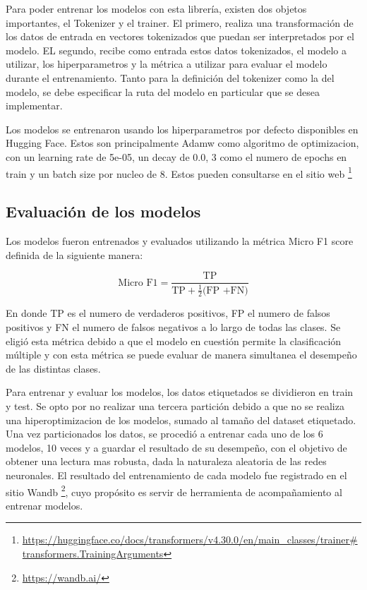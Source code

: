 Para poder entrenar los modelos con esta librería, existen dos objetos importantes, el Tokenizer y el trainer. El primero, realiza una transformación de los datos de entrada en vectores tokenizados que puedan ser interpretados por el modelo. EL segundo, recibe como entrada estos datos tokenizados, el modelo a utilizar, los hiperparametros y la métrica a utilizar para evaluar el modelo durante el entrenamiento. Tanto para la definición del tokenizer como la del modelo, se debe especificar la ruta del modelo en particular que se desea implementar.

Los modelos se entrenaron usando los hiperparametros por defecto disponibles en Hugging Face. Estos son principalmente Adamw como algoritmo de optimizacion, con un learning rate de 5e-05, un
decay de 0.0, 3 como el numero de epochs en train y un batch size por nucleo de 8. Estos pueden consultarse en el sitio web \footnote{\url{https://huggingface.co/docs/transformers/v4.30.0/en/main_classes/trainer#transformers.TrainingArguments}}

\subsection{Evaluación de los modelos}

Los modelos fueron entrenados y evaluados utilizando la métrica Micro F1 score definida de la siguiente manera:


\[
{\text{Micro F1}}=\frac{\text{TP} }{\text{TP} + \frac{1}{2}\text{(FP +FN)}}
\]

En donde TP es el numero de verdaderos positivos, FP el numero de falsos positivos y FN el numero de falsos negativos a lo largo de todas las clases. Se eligió esta métrica debido a que el modelo en cuestión permite la clasificación múltiple y con esta métrica se puede evaluar de manera simultanea el desempeño de las distintas clases.

Para entrenar y evaluar los modelos, los datos etiquetados se dividieron en train y test. Se opto por no realizar una tercera partición debido a que no se realiza una hiperoptimizacion de los modelos, sumado al tamaño del dataset etiquetado. Una vez particionados los datos, se procedió a entrenar cada uno de los 6 modelos, 10 veces y a guardar el resultado de su desempeño, con el objetivo de obtener una lectura mas robusta, dada la naturaleza aleatoria de las redes neuronales. El resultado del entrenamiento de cada modelo fue registrado en el sitio Wandb \footnote{\url{https://wandb.ai/}}, cuyo propósito es servir de herramienta de acompañamiento al entrenar modelos.






